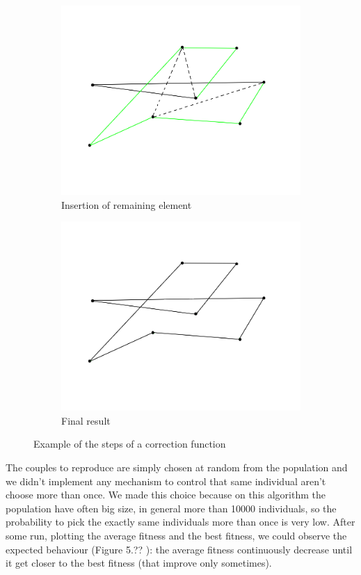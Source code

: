 \begin{figure}[h!]
\begin{subfigure}[b]{0.45\linewidth}
    \includegraphics[width=\linewidth]{media/correction3.png}
    \caption{Insertion of remaining element}
  \end{subfigure}
  \begin{subfigure}[b]{0.45\linewidth}
    \includegraphics[width=\linewidth]{media/correction4.png}
    \caption{Final result}
  \end{subfigure}
  \caption{Example of the steps of a correction function}
\end{figure}

The couples to reproduce are simply chosen at random from the population and we didn't implement any mechanism to control that same individual aren't choose more than once. We made this choice because on this algorithm the population have often big size, in general more than 10000 individuals, so the probability to pick the exactly same individuals more than once is very low.
After some run, plotting the average fitness and the best fitness, we could observe the 
expected behaviour (Figure 5.?? %
 ): the average fitness continuously decrease until it get closer to the best fitness (that improve only sometimes).  \\

